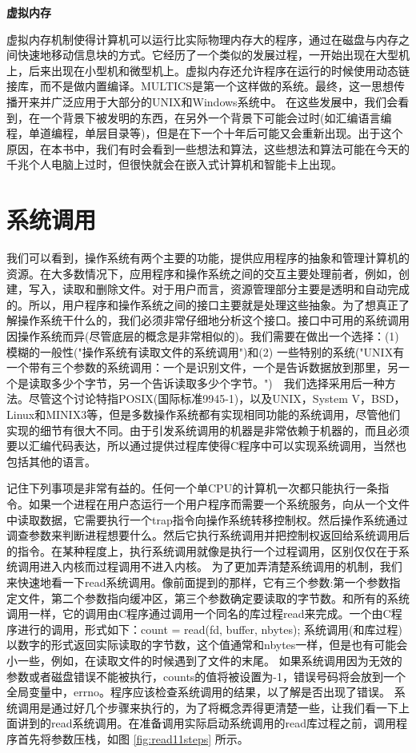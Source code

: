 	\textbf{虚拟内存}
	
	虚拟内存机制使得计算机可以运行比实际物理内存大的程序，通过在磁盘与内存之间快速地移动信息块的方式。它经历了一个类似的发展过程，一开始出现在大型机上，后来出现在小型机和微型机上。虚拟内存还允许程序在运行的时候使用动态链接库，而不是做内置编译。MULTICS是第一个这样做的系统。最终，这一思想传播开来并广泛应用于大部分的UNIX和Windows系统中。
	在这些发展中，我们会看到，在一个背景下被发明的东西，在另外一个背景下可能会过时(如汇编语言编程，单道编程，单层目录等)，但是在下一个十年后可能又会重新出现。出于这个原因，在本书中，我们有时会看到一些想法和算法，这些想法和算法可能在今天的千兆个人电脑上过时，但很快就会在嵌入式计算机和智能卡上出现。 
	
	\section{系统调用}
	
	我们可以看到，操作系统有两个主要的功能，提供应用程序的抽象和管理计算机的资源。在大多数情况下，应用程序和操作系统之间的交互主要处理前者，例如，创建，写入，读取和删除文件。对于用户而言，资源管理部分主要是透明和自动完成的。所以，用户程序和操作系统之间的接口主要就是处理这些抽象。为了想真正了解操作系统干什么的，我们必须非常仔细地分析这个接口。接口中可用的系统调用因操作系统而异(尽管底层的概念是非常相似的)。我们需要在做出一个选择：(1)　模糊的一般性("操作系统有读取文件的系统调用")和(2) 一些特别的系统("UNIX有一个带有三个参数的系统调用：一个是识别文件，一个是告诉数据放到那里，另一个是读取多少个字节，另一个告诉读取多少个字节。")　我们选择采用后一种方法。尽管这个讨论特指POSIX(国际标准9945-1)，以及UNIX，System V，BSD，Linux和MINIX3等，但是多数操作系统都有实现相同功能的系统调用，尽管他们实现的细节有很大不同。由于引发系统调用的机器是非常依赖于机器的，而且必须要以汇编代码表达，所以通过提供过程库使得C程序中可以实现系统调用，当然也包括其他的语言。
	
	记住下列事项是非常有益的。任何一个单CPU的计算机一次都只能执行一条指令。如果一个进程在用户态运行一个用户程序而需要一个系统服务，向从一个文件中读取数据，它需要执行一个trap指令向操作系统转移控制权。然后操作系统通过调查参数来判断进程想要什么。然后它执行系统调用并把控制权返回给系统调用后的指令。在某种程度上，执行系统调用就像是执行一个过程调用，区别仅仅在于系统调用进入内核而过程调用不进入内核。
	为了更加弄清楚系统调用的机制，我们来快速地看一下read系统调用。像前面提到的那样，它有三个参数:第一个参数指定文件，第二个参数指向缓冲区，第三个参数确定要读取的字节数。和所有的系统调用一样，它的调用由C程序通过调用一个同名的库过程read来完成。一个由C程序进行的调用，形式如下：count = read(fd, buffer, nbytes);
	系统调用(和库过程)以数字的形式返回实际读取的字节数，这个值通常和nbytes一样，但是也有可能会小一些，例如，在读取文件的时候遇到了文件的末尾。
	如果系统调用因为无效的参数或者磁盘错误不能被执行，counts的值将被设置为-1，错误号码将会放到一个全局变量中，errno。程序应该检查系统调用的结果，以了解是否出现了错误。
	系统调用是通过好几个步骤来执行的，为了将概念弄得更清楚一些，让我们看一下上面讲到的read系统调用。在准备调用实际启动系统调用的read库过程之前，调用程序首先将参数压栈，如图 \ref{fig:read11steps} 所示。
	
